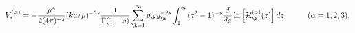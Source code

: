 \begin{equation}
    \label{v*i}
    V_*^{(\alpha)}=
    -{\mu^4 \over 2(4\pi)^{-s}}(ka/\mu)^{-2s} {1\over \Gamma(1-s)}
    \sum_{\k=1}^{\infty} g_\k y_\k^{-2s}
    \int_1^\infty (z^2 -1)^{-s} {d \over dz}
    \ln \left[{\cal H}^{(\alpha)}_\k(z)\right]dz \qquad\quad (\alpha=1,2,3).
\end{equation}

